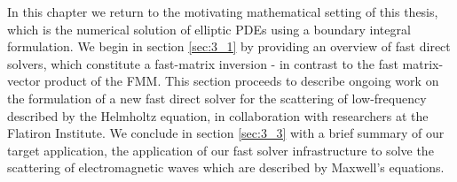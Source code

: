 In this chapter we return to the motivating mathematical setting of this thesis, which is the numerical solution of elliptic PDEs using a boundary integral formulation. We begin in section \ref{sec:3_1} by providing an overview of fast direct solvers, which constitute a fast-matrix inversion - in contrast to the fast matrix-vector product of the FMM. This section proceeds to describe ongoing work on the formulation of a new fast direct solver for the scattering of low-frequency described by the Helmholtz equation, in collaboration with researchers at the Flatiron Institute. We conclude in section \ref{sec:3_3} with a brief summary of our target application, the application of our fast solver infrastructure to solve the scattering of electromagnetic waves which are described by Maxwell's equations.

